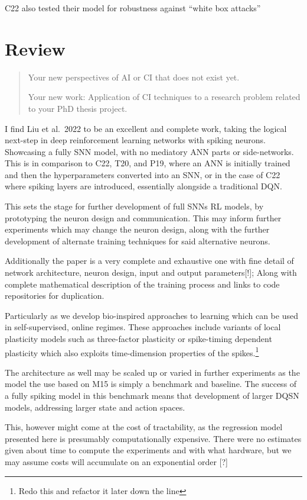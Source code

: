 C22 also tested their model for robustness against ``white box attacks''

\hypertarget{review}{%
\section{Review}\label{review}}

\begin{quote}
Your new perspectives of AI or CI that does not exist yet.

Your new work: Application of CI techniques to a research problem
related to your PhD thesis project.
\end{quote}

I find Liu et al.~2022 to be an excellent and complete work, taking the
logical next-step in deep reinforcement learning networks with spiking
neurons. Showcasing a fully SNN model, with no mediatory ANN parts or
side-networks. This is in comparison to C22, T20, and P19, where an ANN
is initially trained and then the hyperparameters converted into an SNN,
or in the case of C22 where spiking layers are introduced, essentially
alongside a traditional DQN.

This sets the stage for further development of full SNNs RL models, by
prototyping the neuron design and communication. This may inform further
experiments which may change the neuron design, along with the further
development of alternate training techniques for said alternative
neurons.

Additionally the paper is a very complete and exhaustive one with fine
detail of network architecture, neuron design, input and output
parameters{[}!{]}; Along with complete mathematical description of the
training process and links to code repositories for duplication.

Particularly as we develop bio-inspired approaches to learning which can
be used in self-supervised, online regimes. These approaches include
variants of local plasticity models such as three-factor plasticity or
spike-timing dependent plasticity which also exploits time-dimension
properties of the spikes.\footnote{Redo this and refactor it later down
  the line}

The architecture as well may be scaled up or varied in further
experiments as the model the use based on M15 is simply a benchmark and
baseline. The success of a fully spiking model in this benchmark means
that development of larger DQSN models, addressing larger state and
action spaces.

This, however might come at the cost of tractability, as the regression
model presented here is presumably computationally expensive. There were
no estimates given about time to compute the experiments and with what
hardware, but we may assume costs will accumulate on an exponential
order {[}?{]}

